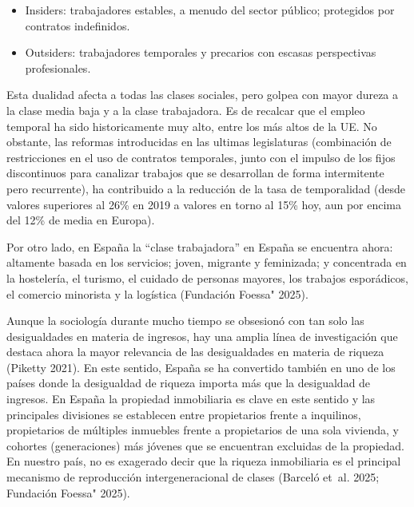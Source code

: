 \documentclass[
  spanish,
  letterpaper,
  DIV=11,
  numbers=noendperiod]{scrreprt}
\begin{document}
\begin{itemize}
\item
  Insiders: trabajadores estables, a menudo del sector público;
  protegidos por contratos indefinidos.
\item
  Outsiders: trabajadores temporales y precarios con escasas
  perspectivas profesionales.
\end{itemize}

Esta dualidad afecta a todas las clases sociales, pero golpea con mayor
dureza a la clase media baja y a la clase trabajadora. Es de recalcar
que el empleo temporal ha sido historicamente muy alto, entre los más
altos de la UE. No obstante, las reformas introducidas en las ultimas
legislaturas (combinación de restricciones en el uso de contratos
temporales, junto con el impulso de los fijos discontinuos para
canalizar trabajos que se desarrollan de forma intermitente pero
recurrente), ha contribuido a la reducción de la tasa de temporalidad
(desde valores superiores al 26\% en 2019 a valores en torno al 15\%
hoy, aun por encima del 12\% de media en Europa).

Por otro lado, en España la ``clase trabajadora'' en España se encuentra
ahora: altamente basada en los servicios; joven, migrante y feminizada;
y concentrada en la hostelería, el turismo, el cuidado de personas
mayores, los trabajos esporádicos, el comercio minorista y la logística
(Fundación Foessa" 2025).

Aunque la sociología durante mucho tiempo se obsesionó con tan solo las
desigualdades en materia de ingresos, hay una amplia línea de
investigación que destaca ahora la mayor relevancia de las desigualdades
en materia de riqueza (Piketty 2021). En este sentido, España se ha
convertido también en uno de los países donde la desigualdad de riqueza
importa más que la desigualdad de ingresos. En España la propiedad
inmobiliaria es clave en este sentido y las principales divisiones se
establecen entre propietarios frente a inquilinos, propietarios de
múltiples inmuebles frente a propietarios de una sola vivienda, y
cohortes (generaciones) más jóvenes que se encuentran excluidas de la
propiedad. En nuestro país, no es exagerado decir que la riqueza
inmobiliaria es el principal mecanismo de reproducción intergeneracional
de clases (Barceló et~al. 2025; Fundación Foessa" 2025).
\end{document}
